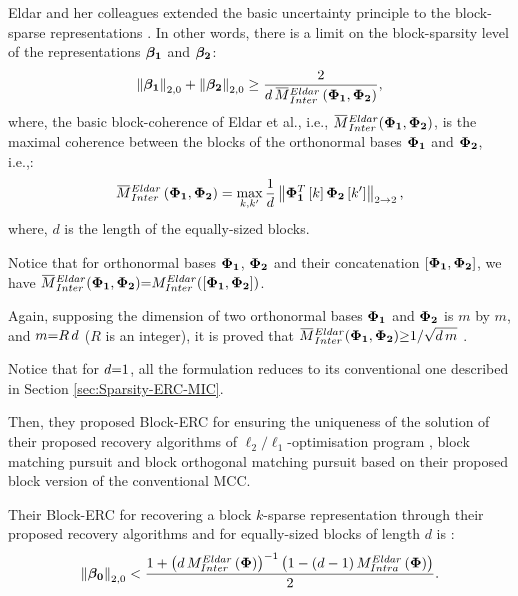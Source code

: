 Eldar and her colleagues extended the basic uncertainty principle to the block-sparse representations \cite{Eldar2009b,Eldar2010b,Eldar2010}.
In other words, there is a limit on the block-sparsity level of the representations $\boldsymbol{\beta_1}$ and $\boldsymbol{\beta_2}$:
\begin{gather}
\label{eq:BUP-Eldar} 
\mynorm{\mybetao}_{2,0} + \mynorm{\mybetaTwo}_{2,0} 
\geq\frac{2}{d \, \overbar{M}^{Eldar}_{Inter} \myparanthese{\myPhiOne,\myPhiTwo}},
\end{gather}
where, the basic block-coherence of Eldar et al., i.e., $\overbar{M}^{Eldar}_{Inter}(\myPhiOne,\myPhiTwo)$, is the maximal coherence between the blocks of the orthonormal bases $\boldsymbol{\Phi}_{\boldsymbol{1}}$ and $\boldsymbol{\Phi}_{\boldsymbol{2}}$, i.e.,:
\begin{equation*}
\overbar{M}^{Eldar}_{Inter}\myparanthese{\myPhiOne,\myPhiTwo} = \max_{k,k'} \frac1d \mynorm{\myPhiOne^T \mybracket{k} \myPhiTwo \mybracket{k'}}_{2 \to 2},
\end{equation*}
where, $d$ is the length of the equally-sized blocks.

Notice that for orthonormal bases $\boldsymbol{\Phi}_{\boldsymbol{1}}$, $\boldsymbol{\Phi}_{\boldsymbol{2}}$ and their concatenation $[\boldsymbol{\Phi}_{\boldsymbol{1}} , \boldsymbol{\Phi}_{\boldsymbol{2}}]$, we have $\overbar{M}^{Eldar}_{Inter}(\myPhiOne,\myPhiTwo) \seq M^{Eldar}_{Inter}([\myPhiOne,\myPhiTwo])$.

{
\label{txt:BasicEldarCCBound} 
Again, supposing the dimension of two orthonormal bases $\boldsymbol{\Phi}_{\boldsymbol{1}}$ and $\boldsymbol{\Phi}_{\boldsymbol{2}}$ is $m$ by $m$, and $m {=} R \, d$ ($R$ is an integer), it is proved that $\overbar{M}^{Eldar}_{Inter}(\myPhiOne,\myPhiTwo) \sgeq 1/\sqrt{d \, m}$ \cite{Eldar2009b,Eldar2010b,Eldar2010}.
}

Notice that for $d {=} 1$, all the formulation reduces to its conventional one described in Section \ref{sec:Sparsity-ERC-MIC}.

Then, they proposed Block-ERC for ensuring the uniqueness of the solution of their proposed recovery algorithms of $\ell_2/\ell_1$-optimisation program \cite{Eldar2009c}, block matching pursuit and block orthogonal matching pursuit \cite{Eldar2009b,Eldar2010b,Eldar2010} based on their proposed block version of the conventional MCC.

Their Block-ERC for recovering a block $k$-sparse representation through their proposed recovery algorithms and for equally-sized blocks of length $d$ is \cite{Eldar2009b,Eldar2010b,Eldar2010}:
\begin{gather}
\label{BERC-Eldar} 
\left\lVert\boldsymbol{\beta_0} \right\rVert_{2,0} < \frac{1+\left( d \, M^{Eldar}_{Inter}\left( \boldsymbol{\Phi} \right) \right)^{-1} \left( 1-\left( d-1 \right)M^{Eldar}_{Intra}\left( \boldsymbol{\Phi} \right) \right)}{2}.
\end{gather}

